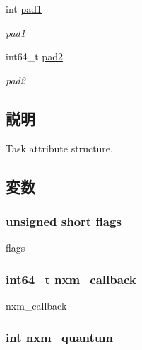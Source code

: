 \begin{DoxyCompactItemize}
int \hyperlink{structTru64_1_1nxm__task__attr_a6c4eee056561c43fe94348a659fb09c4}{pad1}
\begin{DoxyCompactList}\small\item\em pad1 \item\end{DoxyCompactList}\item 
int64\_\-t \hyperlink{structTru64_1_1nxm__task__attr_aba56448df1792d4590740cf5a8784799}{pad2}
\begin{DoxyCompactList}\small\item\em pad2 \item\end{DoxyCompactList}\end{DoxyCompactItemize}


\subsection{説明}
Task attribute structure. 

\subsection{変数}
\hypertarget{structTru64_1_1nxm__task__attr_a1cbb17ede73ea044a04a129bf4d86976}{
\subsubsection[{flags}]{\setlength{\rightskip}{0pt plus 5cm}unsigned short {\bf flags}}}
\label{structTru64_1_1nxm__task__attr_a1cbb17ede73ea044a04a129bf4d86976}


flags \hypertarget{structTru64_1_1nxm__task__attr_a3e280a023ffa784d26a4f41306d718f0}{
\subsubsection[{nxm\_\-callback}]{\setlength{\rightskip}{0pt plus 5cm}int64\_\-t {\bf nxm\_\-callback}}}
\label{structTru64_1_1nxm__task__attr_a3e280a023ffa784d26a4f41306d718f0}


nxm\_\-callback \hypertarget{structTru64_1_1nxm__task__attr_a1edf25e35f3eb9bddad20dec442db246}{
\subsubsection[{nxm\_\-quantum}]{\setlength{\rightskip}{0pt plus 5cm}int {\bf nxm\_\-quantum}}}
\label{structTru64_1_1nxm__task__attr_a1edf25e35f3eb9bddad20dec442db246}


